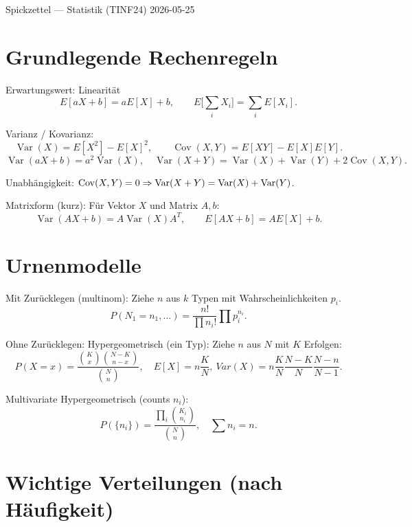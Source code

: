 \documentclass[11pt,a4paper]{article}
\begin{document}
\providecommand{\Cov}{\operatorname{Cov}}

\pagestyle{plain}
\vspace*{-1.5cm}
{\small Spickzettel — Statistik (TINF24) \hfill 2026-05-25}\\
\vspace{0.5ex}

\section*{Grundlegende Rechenregeln}
\begin{compactenum}
\item Erwartungswert: Linearität
\[E[aX+b]=aE[X]+b,\qquad E\Big[\sum_i X_i\Big]=\sum_i E[X_i].\]
\item Varianz / Kovarianz:
\[\operatorname{Var}(X)=E[X^2]-E[X]^2,\qquad \operatorname{Cov}(X,Y)=E[XY]-E[X]E[Y].\]
\[\operatorname{Var}(aX+b)=a^2\operatorname{Var}(X),\quad \operatorname{Var}(X+Y)=\operatorname{Var}(X)+\operatorname{Var}(Y)+2\operatorname{Cov}(X,Y).
\]
\item Unabhängigkeit: $\Cov(X,Y)=0\Rightarrow\Var(X+Y)=\Var(X)+\Var(Y)$.
\item Matrixform (kurz): Für Vektor $X$ und Matrix $A,b$:
\[\operatorname{Var}(AX+b)=A\operatorname{Var}(X)A^T,\qquad E[AX+b]=AE[X]+b.\]
\end{compactenum}

\section*{Urnenmodelle}
\begin{compactenum}
\item Mit Zurücklegen (multinom): Ziehe $n$ aus $k$ Typen mit Wahrscheinlichkeiten $p_i$.
\[P(N_1=n_1,\dots)=\frac{n!}{\prod n_i!}\prod p_i^{n_i}.
\]
\item Ohne Zurücklegen: Hypergeometrisch (ein Typ): Ziehe $n$ aus $N$ mit $K$ Erfolgen:
\[P(X=x)=\frac{\binom{K}{x}\binom{N-K}{n-x}}{\binom{N}{n}},\quad E[X]=n\frac{K}{N},\ Var(X)=n\frac{K}{N}\frac{N-K}{N}\frac{N-n}{N-1}.
\]
\item Multivariate Hypergeometrisch (counts $n_i$):
\[P(\{n_i\})=\frac{\prod_i\binom{K_i}{n_i}}{\binom{N}{n}},\quad \sum n_i=n.\]
\end{compactenum}

\section*{Wichtige Verteilungen (nach Häufigkeit)}
\small
\end{document}
